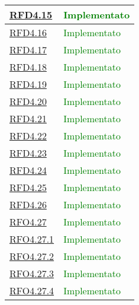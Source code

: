 \begin{longtable}{|>{\centering}m{5cm}|m{5cm}<{\centering}|}
\hyperlink{RFD4.15}{RFD4.15} & \textcolor{green}{Implementato}\\ \hline

\hyperlink{RFD4.16}{RFD4.16} &  \textcolor{green}{Implementato}\\ \hline

\hyperlink{RFD4.17}{RFD4.17} &  \textcolor{green}{Implementato}\\ \hline

\hyperlink{RFD4.18}{RFD4.18} & \textcolor{green}{Implementato}\\ \hline

\hyperlink{RFD4.19}{RFD4.19} & \textcolor{green}{Implementato}\\ \hline

\hyperlink{RFD4.20}{RFD4.20} &   \textcolor{green}{Implementato}\\ \hline

\hyperlink{RFD4.21}{RFD4.21} & \textcolor{green}{Implementato}\\ \hline

\hyperlink{RFD4.22}{RFD4.22} &   \textcolor{green}{Implementato}\\ \hline

\hyperlink{RFD4.23}{RFD4.23} & \textcolor{green}{Implementato}\\ \hline

\hyperlink{RFD4.24}{RFD4.24} & \textcolor{green}{Implementato}\\ \hline

\hyperlink{RFD4.25}{RFD4.25} & \textcolor{green}{Implementato}\\ \hline

\hyperlink{RFD4.26}{RFD4.26}  &  \textcolor{green}{Implementato}\\ \hline

\hyperlink{RFO4.27}{RFO4.27} &  \textcolor{green}{Implementato}\\ \hline

\hyperlink{RFO4.27.1}{RFO4.27.1} &  \textcolor{green}{Implementato}\\ \hline

\hyperlink{RFO4.27.2}{RFO4.27.2} &  \textcolor{green}{Implementato}\\ \hline

\hyperlink{RFO4.27.3}{RFO4.27.3} &  \textcolor{green}{Implementato}\\ \hline

\hyperlink{RFO4.27.4}{RFO4.27.4}  & \textcolor{green}{Implementato}\\ \hline


\end{longtable}
